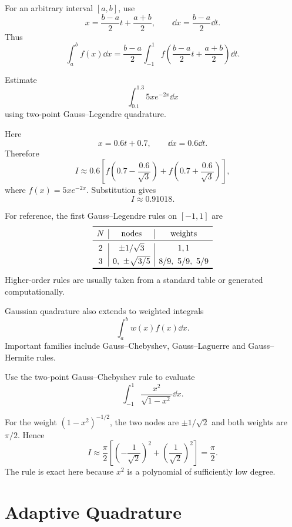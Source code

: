 For an arbitrary interval $[a,b]$, use
\[
 x=\frac{b-a}{2}t+\frac{a+b}{2},
 \qquad
 \dd x=\frac{b-a}{2}\dd t.
\]
Thus
\[
 \int_a^b f(x)\dd x
 =\frac{b-a}{2}
 \int_{-1}^{1}
 f\left(\frac{b-a}{2}t+\frac{a+b}{2}\right)\dd t.
\]

\begin{example}
Estimate
\[
 \int_{0.1}^{1.3}5xe^{-2x}\dd x
\]
using two-point Gauss--Legendre quadrature.
\end{example}

\begin{solution}[4.5cm]
Here
\[
 x=0.6t+0.7,
 \qquad \dd x=0.6\dd t.
\]
Therefore
\[
 I\approx0.6\left[
 f\left(0.7-\frac{0.6}{\sqrt3}\right)
 +f\left(0.7+\frac{0.6}{\sqrt3}\right)
 \right],
\]
where $f(x)=5xe^{-2x}$.  Substitution gives
\[
 I\approx0.91018.
\]
\end{solution}

For reference, the first Gauss--Legendre rules on $[-1,1]$ are
\[
\begin{array}{c|c|c}
\toprule
N&\text{nodes}&\text{weights}\\
\midrule
2&\pm1/\sqrt3&1,1\\[1mm]
3&0,\ \pm\sqrt{3/5}&8/9,\ 5/9,\ 5/9\\
\bottomrule
\end{array}
\]
Higher-order rules are usually taken from a standard table or generated computationally.

Gaussian quadrature also extends to weighted integrals
\[
 \int_a^b w(x)f(x)\dd x.
\]
Important families include Gauss--Chebyshev, Gauss--Laguerre and Gauss--Hermite rules.

\begin{example}
Use the two-point Gauss--Chebyshev rule to evaluate
\[
 \int_{-1}^{1}\frac{x^2}{\sqrt{1-x^2}}\dd x.
\]
\end{example}

\begin{solution}[3.2cm]
For the weight $(1-x^2)^{-1/2}$, the two nodes are
$\pm1/\sqrt2$ and both weights are $\pi/2$.  Hence
\[
 I\approx\frac\pi2
 \left[\left(-\frac1{\sqrt2}\right)^2
 +\left(\frac1{\sqrt2}\right)^2\right]
 =\frac\pi2.
\]
The rule is exact here because $x^2$ is a polynomial of sufficiently low degree.
\end{solution}

\section{Adaptive Quadrature}

